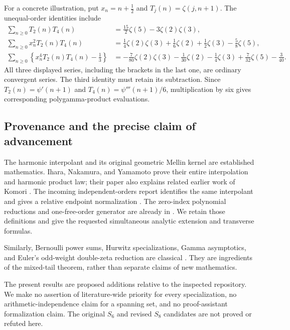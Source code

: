 \documentclass[11pt,letterpaper]{article}
\numberwithin{equation}{section}
\theoremstyle{plain}
\theoremstyle{definition}
\theoremstyle{remark}
\begin{document}
For a concrete illustration, put $x_n=n+\tfrac12$ and
$T_j(n)=\zeta(j,n+1)$. The unequal-order identities include
\begin{align}
 \sum_{n\geq0}T_2(n)T_4(n)
  &=\frac{15}{2}\zeta(5)-3\zeta(2)\zeta(3),\label{scope:first}\\
 \sum_{n\geq0}x_n^2T_2(n)T_4(n)
  &=\frac14\zeta(2)\zeta(3)+\frac16\zeta(2)
       +\frac12\zeta(3)-\frac58\zeta(5),\label{scope:second}\\
 \sum_{n\geq0}\left\{x_n^4T_2(n)T_4(n)-\frac13\right\}
  &=-\frac7{80}\zeta(2)\zeta(3)-\frac1{30}\zeta(2)
       -\frac14\zeta(3)+\frac7{32}\zeta(5)-\frac3{40}.
       \label{scope:third}
\end{align}
All three displayed series, including the brackets in the last one,
are ordinary convergent series. The third identity must retain its
subtraction. Since $T_2(n)=\psi'(n+1)$ and
$T_4(n)=\psi'''(n+1)/6$, multiplication by six gives corresponding
polygamma-product evaluations.

\subsection{Provenance and the precise claim of advancement}

The harmonic interpolant and its original geometric Mellin kernel are
established mathematics. Ihara, Nakamura, and Yamamoto prove their
entire interpolation and harmonic product law; their paper also
explains related earlier work of Komori
\cite[Proposition 3.3, Theorem 4.1, Corollary 4.2]{INY}.
The incoming independent-orders report identifies the same interpolant
and gives a relative endpoint normalization \cite{IncomingIndependent}.
The zero-index polynomial reductions and one-free-order generator are
already in \cite{IncomingParity}. We retain those definitions and give
the requested simultaneous analytic extension and transverse formulas.

Similarly, Bernoulli power sums, Hurwitz specializations, Gamma
asymptotics, and Euler's odd-weight double-zeta reduction are classical
\cite{DLMFHurwitz,DLMFGamma,DLMFBernoulli,Bradley2007}.
They are ingredients of the mixed-tail theorem, rather than separate
claims of new mathematics.

The present results are proposed additions relative to the inspected
repository. We make no assertion of literature-wide priority for every
specialization, no arithmetic-independence claim for a spanning set, and
no proof-assistant formalization claim. The original $S_6$ and revised
$S_8$ candidates are not proved or refuted here.
\end{document}
